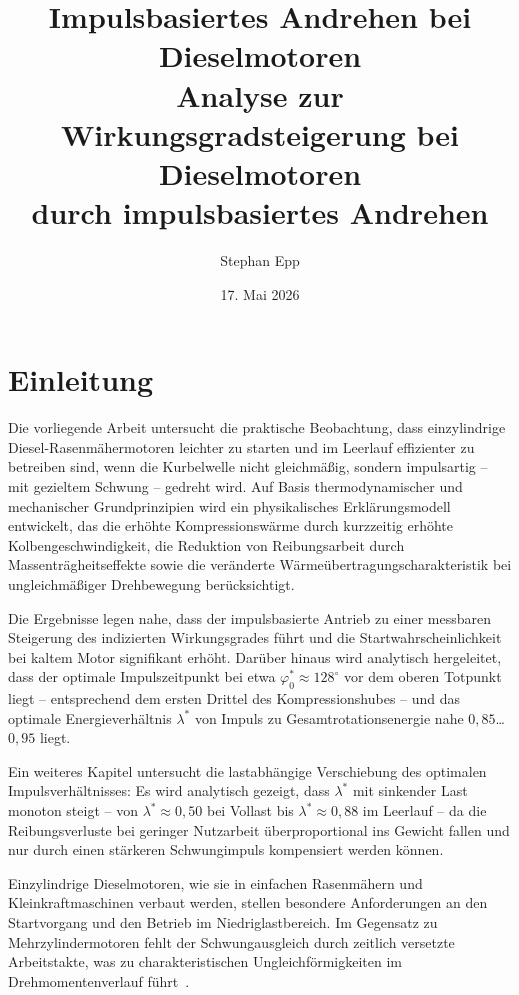 ﻿\documentclass[a4paper,12pt]{article}
\title{%
  \textbf{Impulsbasiertes Andrehen bei Dieselmotoren}\\[1em]
  \large Analyse zur Wirkungsgradsteigerung bei Dieselmotoren\\ durch impulsbasiertes Andrehen}
\author{Stephan Epp}
\date{17. Mai 2026}
\begin{document}
\maketitle
\tableofcontents
\newpage

\section{Einleitung}
Die vorliegende Arbeit untersucht die praktische Beobachtung, dass einzylindrige
Diesel-Rasenmähermotoren leichter zu starten und im Leerlauf effizienter zu betreiben
sind, wenn die Kurbelwelle nicht gleichmäßig, sondern impulsartig -- mit gezieltem
Schwung -- gedreht wird. Auf Basis thermodynamischer und mechanischer Grundprinzipien
wird ein physikalisches Erklärungsmodell entwickelt, das die erhöhte Kompressionswärme
durch kurzzeitig erhöhte Kolbengeschwindigkeit, die Reduktion von Reibungsarbeit durch
Massenträgheitseffekte sowie die veränderte Wärmeübertragungscharakteristik bei
ungleichmäßiger Drehbewegung berücksichtigt.

Die Ergebnisse legen nahe, dass der impulsbasierte Antrieb zu einer messbaren Steigerung des indizierten Wirkungsgrades führt und die Startwahrscheinlichkeit bei kaltem Motor signifikant erhöht. Darüber hinaus wird analytisch hergeleitet, dass der optimale Impulszeitpunkt bei etwa $\varphi_0^* \approx 128^\circ$ vor dem oberen Totpunkt liegt -- entsprechend dem ersten Drittel des Kompressionshubes -- und das optimale Energieverhältnis $\lambda^*$ von Impuls zu Gesamtrotationsenergie nahe $0{,}85$\ldots$0{,}95$ liegt.

Ein weiteres Kapitel untersucht die lastabhängige Verschiebung des optimalen
Impulsverhältnisses: Es wird analytisch gezeigt, dass $\lambda^*$ mit sinkender
Last monoton steigt -- von $\lambda^* \approx 0{,}50$ bei Vollast bis
$\lambda^* \approx 0{,}88$ im Leerlauf -- da die Reibungsverluste bei
geringer Nutzarbeit überproportional ins Gewicht fallen und nur durch
einen stärkeren Schwungimpuls kompensiert werden können.

Einzylindrige Dieselmotoren, wie sie in einfachen Rasenmähern und Kleinkraftmaschinen
verbaut werden, stellen besondere Anforderungen an den Startvorgang und den Betrieb im
Niedriglastbereich. Im Gegensatz zu Mehrzylindermotoren fehlt der Schwungausgleich durch
zeitlich versetzte Arbeitstakte, was zu charakteristischen Ungleichförmigkeiten im
Drehmomentenverlauf führt~\cite{bosch2014}.
\end{document}
